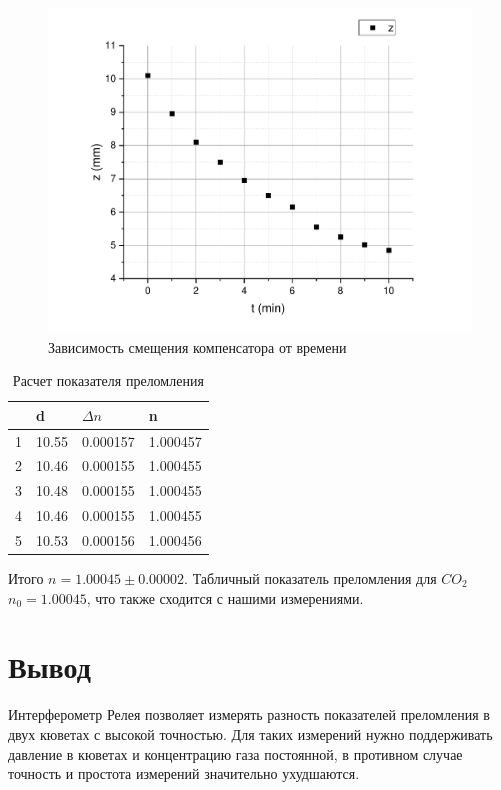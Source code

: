 \documentclass[12pt]{article}
\begin{document}
	\begin{figure}[h!]
		\begin{center}
			\includegraphics[width = \linewidth]{dt}
			\caption{Зависимость смещения компенсатора от времени}
		\end{center}
	\end{figure}
	\begin{table}[h!]
		\centering
		\caption{Расчет показателя преломления}
		\label{my-label}
		\begin{tabular}{|l|l|l|l|}
			\hline
			& d     & $\Delta n$ & n          \\ \hline
			1 & 10.55 & 0.000157   & 1.000457 \\ \hline
			2 & 10.46 & 0.000155   & 1.000455 \\ \hline
			3 & 10.48 & 0.000155   & 1.000455 \\ \hline
			4 & 10.46 & 0.000155   & 1.000455 \\ \hline
			5 & 10.53 & 0.000156   & 1.000456 \\ \hline
		\end{tabular}
	\end{table}
	
	\newpage
	
	
	Итого $n = 1.00045 \pm 0.00002$. Табличный показатель преломления для $CO_2$ $n_0 = 1.00045$, что также сходится с нашими измерениями.
	
	\section{Вывод}
	Интерферометр Релея позволяет измерять разность показателей преломления в двух кюветах с высокой точностью. Для таких измерений нужно поддерживать давление в кюветах и концентрацию газа постоянной, в противном случае точность и простота измерений значительно ухудшаются.
	

	
\end{document}

